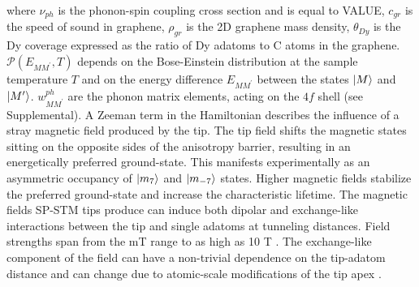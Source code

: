 \documentclass[
reprint,amsmath,amssymb,aps]{revtex4-2}
\begin{document}
where $\nu_{ph}$ is the phonon-spin coupling cross section and is equal to VALUE, $c_{gr}$ is the speed of sound in graphene, $\rho_{gr}$ is the 2D graphene mass density, $\theta_{Dy}$ is the Dy coverage expressed as the ratio of Dy adatoms to C atoms in the graphene. $\mathcal{P}\left( E_{MM^{\prime}}, T \right)$ depends on the Bose-Einstein distribution at the sample temperature $T$ and on the energy difference $E_{MM^{\prime}}$ between the states $\ket{M}$ and $\ket{M^{\prime}}$. $w^{ph}_{MM^{\prime}}$ are the phonon matrix elements, acting on the $4f$ shell (see Supplemental).
A Zeeman term in the Hamiltonian describes the influence of a stray magnetic field produced by the tip. The tip field shifts the magnetic states sitting on the opposite sides of the anisotropy barrier, resulting in an energetically preferred ground-state. This manifests experimentally as an asymmetric occupancy of $\ket{m_7}$ and $\ket{m_{-7}}$ states. Higher magnetic fields stabilize the preferred ground-state and increase the characteristic lifetime. The magnetic fields SP-STM tips produce can induce both dipolar and exchange-like interactions between the tip and single adatoms at tunneling distances. Field strengths span from the mT range to as high as 10 T \cite{yang2019}. The exchange-like component of the field can have a non-trivial dependence on the tip-adatom distance and can change due to atomic-scale modifications of the tip apex \cite{hauptmannQuantifyingExchangeForces2020,tao_SwitchingSingleSpin_2009,lazoFirstprinciplesStudyMagnetic2011,lazoRoleTipSize2008}.  
\end{document}
